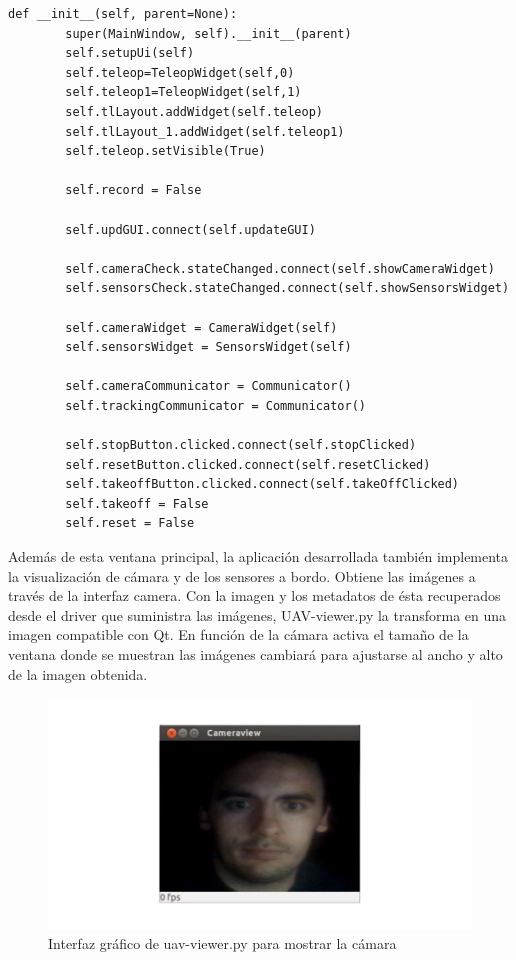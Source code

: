 \begin{lstlisting}[frame=single]
 def __init__(self, parent=None):
        super(MainWindow, self).__init__(parent)
        self.setupUi(self)
        self.teleop=TeleopWidget(self,0)
        self.teleop1=TeleopWidget(self,1)
        self.tlLayout.addWidget(self.teleop)
        self.tlLayout_1.addWidget(self.teleop1)
        self.teleop.setVisible(True)

        self.record = False

        self.updGUI.connect(self.updateGUI)

        self.cameraCheck.stateChanged.connect(self.showCameraWidget)
        self.sensorsCheck.stateChanged.connect(self.showSensorsWidget)

        self.cameraWidget = CameraWidget(self)
        self.sensorsWidget = SensorsWidget(self)

        self.cameraCommunicator = Communicator()
        self.trackingCommunicator = Communicator()

        self.stopButton.clicked.connect(self.stopClicked)
        self.resetButton.clicked.connect(self.resetClicked)
        self.takeoffButton.clicked.connect(self.takeOffClicked)
        self.takeoff = False
        self.reset = False
\end{lstlisting}

Además de esta ventana principal, la aplicación desarrollada también implementa la visualización de cámara y de los sensores a bordo. Obtiene las imágenes a través de la interfaz camera. Con la imagen y los metadatos de ésta recuperados desde el driver que suministra las imágenes, UAV-viewer.py la transforma en una imagen compatible con Qt. En función de la cámara activa el tamaño de la ventana donde se muestran las imágenes cambiará para ajustarse al ancho y alto de la imagen obtenida.

\begin{figure}[H]
  \centering
  \includegraphics[scale=0.4]{imagenes/cameraView.png}
  \caption{Interfaz gráfico de uav-viewer.py para mostrar la cámara}
  \label{fig:cameraView}
\end{figure}

